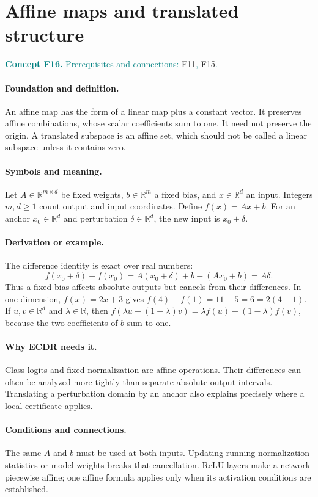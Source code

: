 \documentclass[11pt,a4paper]{article}
\newcommand{\R}{\mathbb R}
\newcommand{\conceptid}{Front matter}
\newcommand{\concept}[3]{\clearpage\renewcommand{\conceptid}{#1}%
\section{#2}\label{concept:#1}%
\textcolor{teal}{\textbf{Concept #1.} Prerequisites and connections: #3.}\par
\typeout{ECDR-CONCEPT-START #1 PAGE=\thepage}}
\begin{document}
\concept{F16}{Affine maps and translated structure}{\hyperref[concept:F11]{F11}, \hyperref[concept:F15]{F15}}
\paragraph{Foundation and definition.}
An affine map has the form of a linear map plus a constant vector.
It preserves affine combinations, whose scalar coefficients sum to one.
It need not preserve the origin. A translated subspace is an affine set,
which should not be called a linear subspace unless it contains zero.
\paragraph{Symbols and meaning.}
Let $A\in\R^{m\times d}$ be fixed weights,
$b\in\R^m$ a fixed bias, and $x\in\R^d$ an input. Integers
$m,d\ge1$ count output and input coordinates. Define
$f(x)=Ax+b$. For an anchor $x_0\in\R^d$ and perturbation
$\delta\in\R^d$, the new input is $x_0+\delta$.
\paragraph{Derivation or example.}
The difference identity is exact over real numbers:
\[
 f(x_0+\delta)-f(x_0)
 =A(x_0+\delta)+b-(Ax_0+b)=A\delta.
\]
Thus a fixed bias affects absolute outputs but cancels from their
differences. In one dimension, $f(x)=2x+3$ gives
$f(4)-f(1)=11-5=6=2(4-1)$.
If $u,v\in\R^d$ and $\lambda\in\R$, then
$f(\lambda u+(1-\lambda)v)=\lambda f(u)+(1-\lambda)f(v)$,
because the two coefficients of $b$ sum to one.
\paragraph{Why ECDR needs it.}
Class logits and fixed normalization are affine operations. Their
differences can often be analyzed more tightly than separate absolute
output intervals. Translating a perturbation domain by an anchor also
explains precisely where a local certificate applies.
\paragraph{Conditions and connections.}
The same $A$ and $b$ must be used at both inputs. Updating running
normalization statistics or model weights breaks that cancellation.
ReLU layers make a network piecewise affine; one affine formula applies
only when its activation conditions are established.
\par\label{endconcept:F16}
\end{document}
